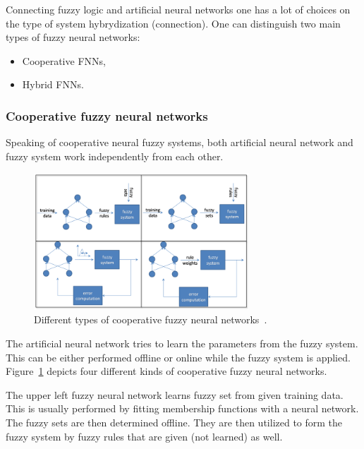 Connecting fuzzy logic and artificial neural networks one has a lot of choices on the type of system hybrydization (connection).
One can distinguish two main types of fuzzy neural networks: 
\begin{itemize}
\item Cooperative FNNs,
\item Hybrid FNNs.
\end{itemize}

\subsubsection{Cooperative fuzzy neural networks}
Speaking of cooperative neural fuzzy systems, both artificial neural network and fuzzy system work independently from each other.

\begin{figure}
	\vspace*{-1.5em}
	\includegraphics[width=0.72\textwidth]{images/fnn_cooperative_types.png}
	\caption{Different types of cooperative fuzzy neural networks~\cite{scholarpedia_fuzzy_neural}.}
	\label{fig:fnn_cooperative}
\end{figure}

The artificial neural network tries to learn the parameters from the fuzzy system. This can be either performed offline or online while the fuzzy system is applied.
Figure~\ref{fig:fnn_cooperative} depicts four different kinds of cooperative fuzzy neural networks.

The upper left fuzzy neural network learns fuzzy set from given training data.
This is usually performed by fitting membership functions with a neural network.
The fuzzy sets are then determined offline.
They are then utilized to form the fuzzy system by fuzzy rules that are given (not learned) as well.

